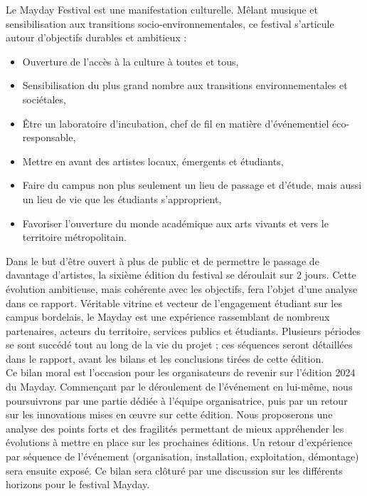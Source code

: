 \documentclass[12pt,a4paper]{report}
\begin{document}
Le Mayday Festival est une manifestation culturelle. Mêlant musique et sensibilisation aux transitions socio-environnementales, ce festival s'articule autour d'objectifs durables et ambitieux :
\begin{itemize}
\item Ouverture de l’accès à la culture à toutes et tous,
\item Sensibilisation du plus grand nombre aux transitions environnementales et sociétales,
\item Être un laboratoire d’incubation, chef de fil en matière d’événementiel éco-responsable,
\item Mettre en avant des artistes locaux, émergents et étudiants,
\item Faire du campus non plus seulement un lieu de passage et d'étude, mais aussi un lieu de vie que les étudiants s'approprient,
\item Favoriser l’ouverture du monde académique aux arts vivants et vers le territoire métropolitain.\\
\end{itemize}

Dans le but d’être ouvert à plus de public et de permettre le passage de davantage d’artistes, la sixième édition du festival se déroulait sur 2 jours. Cette évolution ambitieuse, mais cohérente avec les objectifs, fera l’objet d’une analyse dans ce rapport. Véritable vitrine et vecteur de l'engagement étudiant sur les campus bordelais, le Mayday est une expérience rassemblant de nombreux partenaires, acteurs du territoire, services publics et étudiants. Plusieurs périodes se sont succédé tout au long de la vie du projet ; ces séquences seront détaillées dans le rapport, avant les bilans et les conclusions tirées de cette édition.\\

Ce bilan moral est l’occasion pour les organisateurs de revenir sur l’édition 2024 du Mayday. Commençant par le déroulement de l'événement en lui-même, nous poursuivrons par une partie dédiée à l'équipe organisatrice, puis par un retour sur les innovations mises en œuvre sur cette édition. Nous proposerons une analyse des points forts et des fragilités permettant de mieux appréhender les évolutions à mettre en place sur les prochaines éditions. Un retour d'expérience par séquence de l'événement (organisation, installation, exploitation, démontage) sera ensuite exposé. Ce bilan sera clôturé par une discussion sur les différents horizons pour le festival Mayday.
\end{document}
